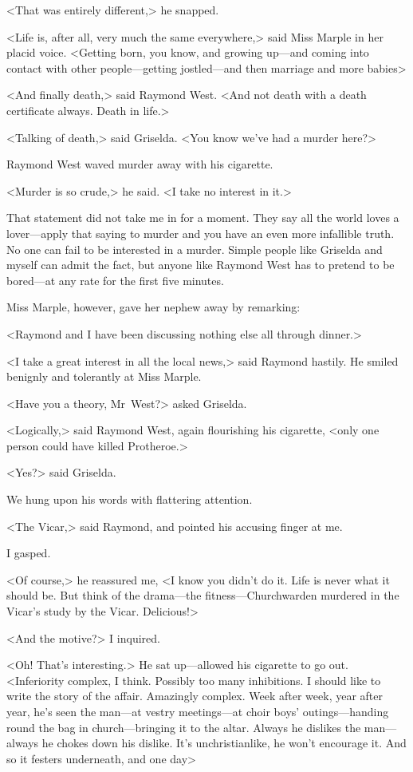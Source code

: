 <That was entirely different,> he snapped.

<Life is, after all, very much the same everywhere,> said Miss Marple in her placid voice. <Getting born, you know, and growing up—and coming into contact with other people—getting jostled—and then marriage and more babies\longdash>

<And finally death,> said Raymond West. <And not death with a death certificate always. Death in life.>

<Talking of death,> said Griselda. <You know we've had a murder here?>

Raymond West waved murder away with his cigarette.

<Murder is so crude,> he said. <I take no interest in it.>

That statement did not take me in for a moment. They say all the world loves a lover—apply that saying to murder and you have an even more infallible truth. No one can fail to be interested in a murder. Simple people like Griselda and myself can admit the fact, but anyone like Raymond West has to pretend to be bored—at any rate for the first five minutes.

Miss Marple, however, gave her nephew away by remarking:

<Raymond and I have been discussing nothing else all through dinner.>

<I take a great interest in all the local news,> said Raymond hastily. He smiled benignly and tolerantly at Miss Marple.

<Have you a theory, Mr~West?> asked Griselda.

<Logically,> said Raymond West, again flourishing his cigarette, <only one person could have killed Protheroe.>

<Yes?> said Griselda.

We hung upon his words with flattering attention.

<The Vicar,> said Raymond, and pointed his accusing finger at me.

I gasped.

<Of course,> he reassured me, <I know you didn't do it. Life is never what it should be. But think of the drama—the fitness—Churchwarden murdered in the Vicar's study by the Vicar. Delicious!>

<And the motive?> I inquired.

<Oh! That's interesting.> He sat up—allowed his cigarette to go out. <Inferiority complex, I think. Possibly too many inhibitions. I should like to write the story of the affair. Amazingly complex. Week after week, year after year, he's seen the man—at vestry meetings—at choir boys' outings—handing round the bag in church—bringing it to the altar. Always he dislikes the man—always he chokes down his dislike. It's unchristianlike, he won't encourage it. And so it festers underneath, and one day\longdash>

